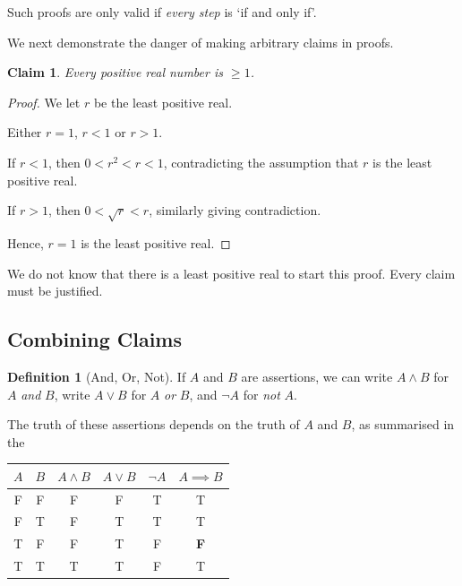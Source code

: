 \documentclass{article}
\newtheorem{claim}[theorem]{Claim}
\theoremstyle{definition}
\newtheorem{definition}[theorem]{Definition}
\theoremstyle{remark}
\begin{document}
Such proofs are only valid if \emph{every step} is `if and only if'.

We next demonstrate the danger of making arbitrary claims in proofs.

\begin{claim}
    Every positive real number is \(\geq 1\).
\end{claim}

\begin{proof}
    We let \(r\) be the least positive real.

    Either \(r = 1\), \(r < 1\) or \(r > 1\).

    If \(r < 1\), then \(0 < r^2 < r < 1\), contradicting the assumption that \(r\) is the least positive real.

    If \(r > 1\), then \(0 < \sqrt{r} < r\), similarly giving contradiction.

    Hence, \(r = 1\) is the least positive real.
\end{proof}

We do not know that there is a least positive real to start this proof. Every claim must be justified.

\subsection{Combining Claims}
\label{sec:combining-claims}

\begin{definition}[And, Or, Not]
    If \(A\) and \(B\) are assertions, we can write \(A \land B\) for \(A\) \emph{and} \(B\), write \(A \lor B\) for \(A\) \emph{or} \(B\), and \(\lnot A\) for \emph{not} \(A\).
\end{definition}

The truth of these assertions depends on the truth of \(A\) and \(B\), as summarised in the

\begin{table}[ht!]
    \centering
    \begin{tabular}{cc|cccc}
        \(A\) & \(B\) & \(A \land B\) & \(A \lor B\) & \(\lnot A\) & \(A \implies B\) \\
        \hline
        F & F & F & F & T & T \\
        F & T & F & T & T & T \\
        T & F & F & T & F & \textbf{F} \\
        T & T & T & T & F & T
    \end{tabular}
\end{table}
\end{document}
